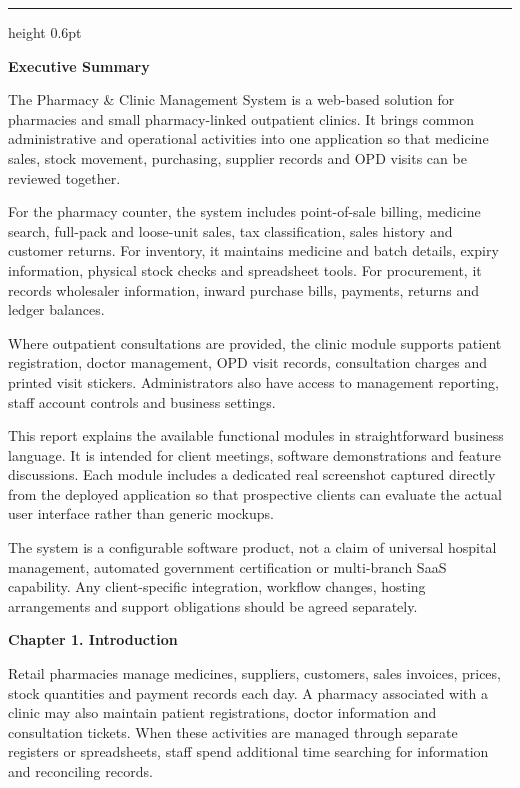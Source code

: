 \documentclass[11pt,a4paper]{article}
\newcommand{\chaptertitle}[1]{%
    \vspace*{0.2cm}%
    {\normalfont\LARGE\bfseries\color{HeaderNavy} #1}%
    \vspace*{0.3cm}\par%
}
\begin{document}
\vspace{0.6cm}
\hrule height 0.6pt
\vspace{0.6cm}

{\Large\bfseries\color{HeaderNavy} Executive Summary}
\vspace*{0.25cm}

The Pharmacy \& Clinic Management System is a web-based solution for pharmacies and small pharmacy-linked outpatient clinics. It brings common administrative and operational activities into one application so that medicine sales, stock movement, purchasing, supplier records and OPD visits can be reviewed together.

For the pharmacy counter, the system includes point-of-sale billing, medicine search, full-pack and loose-unit sales, tax classification, sales history and customer returns. For inventory, it maintains medicine and batch details, expiry information, physical stock checks and spreadsheet tools. For procurement, it records wholesaler information, inward purchase bills, payments, returns and ledger balances.

Where outpatient consultations are provided, the clinic module supports patient registration, doctor management, OPD visit records, consultation charges and printed visit stickers. Administrators also have access to management reporting, staff account controls and business settings.

This report explains the available functional modules in straightforward business language. It is intended for client meetings, software demonstrations and feature discussions. Each module includes a dedicated real screenshot captured directly from the deployed application so that prospective clients can evaluate the actual user interface rather than generic mockups.

The system is a configurable software product, not a claim of universal hospital management, automated government certification or multi-branch SaaS capability. Any client-specific integration, workflow changes, hosting arrangements and support obligations should be agreed separately.

\newpage
\chaptertitle{Chapter 1. Introduction}

Retail pharmacies manage medicines, suppliers, customers, sales invoices, prices, stock quantities and payment records each day. A pharmacy associated with a clinic may also maintain patient registrations, doctor information and consultation tickets. When these activities are managed through separate registers or spreadsheets, staff spend additional time searching for information and reconciling records.
\end{document}
